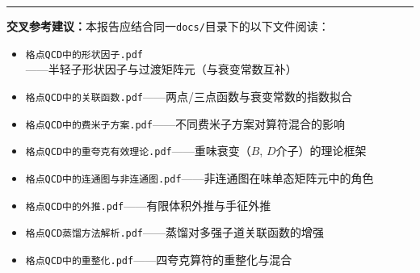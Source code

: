 \documentclass[12pt,a4paper]{ctexart}
\theoremstyle{definition}
\begin{document}
\vspace{0.5cm}
\noindent\rule{\textwidth}{0.5pt}
\small
\textbf{交叉参考建议：}本报告应结合同一\texttt{docs/}目录下的以下文件阅读：
\begin{itemize}[nosep]
    \item \texttt{格点QCD中的形状因子.pdf}——半轻子形状因子与过渡矩阵元（与衰变常数互补）
    \item \texttt{格点QCD中的关联函数.pdf}——两点/三点函数与衰变常数的指数拟合
    \item \texttt{格点QCD中的费米子方案.pdf}——不同费米子方案对算符混合的影响
    \item \texttt{格点QCD中的重夸克有效理论.pdf}——重味衰变（$B$, $D$介子）的理论框架
    \item \texttt{格点QCD中的连通图与非连通图.pdf}——非连通图在味单态矩阵元中的角色
    \item \texttt{格点QCD中的外推.pdf}——有限体积外推与手征外推
    \item \texttt{格点QCD蒸馏方法解析.pdf}——蒸馏对多强子道关联函数的增强
    \item \texttt{格点QCD中的重整化.pdf}——四夸克算符的重整化与混合
\end{itemize}
\end{document}
